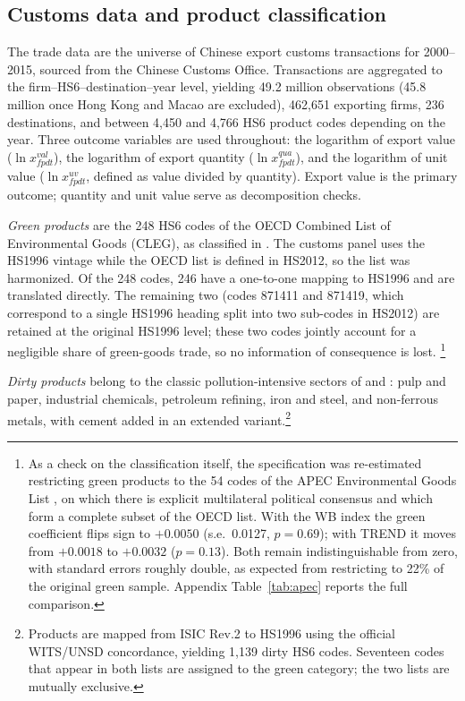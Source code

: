 \documentclass[12pt]{article}
\begin{document}
\subsection{Customs data and product classification}

The trade data are the universe of Chinese export customs transactions for 2000--2015,
sourced from the Chinese Customs Office. Transactions are aggregated
to the firm--HS6--destination--year level, yielding 49.2 million observations (45.8
million once Hong Kong and Macao are excluded), 462{,}651 exporting firms, 236
destinations, and between 4{,}450 and 4{,}766 HS6 product codes depending on the year. Three outcome variables are used throughout:
the logarithm of export value ($\ln x^{val}_{fpdt}$), the logarithm of export quantity
($\ln x^{qua}_{fpdt}$), and the logarithm of unit value ($\ln x^{uv}_{fpdt}$, defined as
value divided by quantity). Export value is the primary outcome; quantity and unit value serve as decomposition checks.

\emph{Green products} are the 248 HS6 codes of the OECD Combined List of Environmental
Goods (CLEG), as classified in \citet{sauvage2014}. The customs panel uses the HS1996
vintage while the OECD list is defined in HS2012, so the list was harmonized. Of the 248
codes, 246 have a one-to-one mapping to HS1996 and are translated directly. The remaining
two (codes 871411 and 871419, which correspond to a single HS1996 heading split into two
sub-codes in HS2012) are retained at the original HS1996 level; these two codes jointly
account for a negligible share of green-goods trade, so no information of consequence is
lost.
\footnote{As a check on the classification itself, the specification was re-estimated
restricting green products to the 54 codes of the APEC Environmental Goods List
\citep{sauvage2014}, on which there is explicit multilateral political consensus and which
form a complete subset of the OECD list. With the WB index the green coefficient flips
sign to $+0.0050$ (s.e.\ 0.0127, $p=0.69$); with TREND it moves from $+0.0018$ to
$+0.0032$ ($p=0.13$). Both remain indistinguishable from zero, with standard errors
roughly double, as expected from restricting to 22\% of the original green sample. Appendix Table~\ref{tab:apec} reports the full comparison.}

\emph{Dirty products} belong to the classic pollution-intensive sectors of
\citet{mani1998} and \citet{low1992}: pulp and paper, industrial chemicals, petroleum
refining, iron and steel, and non-ferrous metals, with cement added in an extended
variant.\footnote{Products are mapped from ISIC Rev.2 to HS1996 using the official WITS/UNSD concordance, yielding 1{,}139 dirty HS6 codes. Seventeen codes that appear in both lists are assigned to the green category; the two lists are mutually exclusive.}
\end{document}
